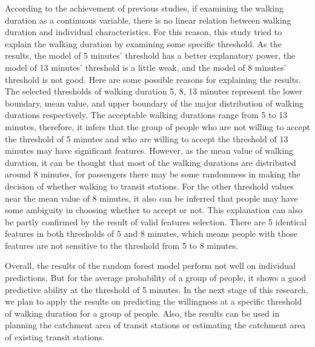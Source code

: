 \documentclass[Journal,letterpaper]{ascelike-new}
\begin{document}
%
According to the achievement of previous studies, if examining the walking duration as a continuous variable, there is no linear relation between walking duration and individual characteristics. For this reason, this study tried to explain the walking duration by examining some specific threshold. As the results, the model of 5 minutes’ threshold has a better explanatory power, the model of 13 minutes' threshold is a little weak, and the model of 8 minutes' threshold is not good. Here are some possible reasons for explaining the results. The selected thresholds of walking duration 5, 8, 13 minutes represent the lower boundary, mean value, and upper boundary of the major distribution of walking durations respectively. The acceptable walking durations range from 5 to 13 minutes, therefore, it infers that the group of people who are not willing to accept the threshold of 5 minutes and who are willing to accept the threshold of 13 minutes may have significant features. However, as the mean value of walking duration, it can be thought that most of the walking durations are distributed around 8 minutes, for passengers there may be some randomness in making the decision of whether walking to transit stations. For the other threshold values near the mean value of 8 minutes, it also can be inferred that people may have some ambiguity in choosing whether to accept or not. This explanation can also be partly confirmed by the result of valid features selection. There are 5 identical features in both thresholds of 5 and 8 minutes, which means people with those features are not sensitive to the threshold from 5 to 8 minutes.

%
Overall, the results of the random forest model perform not well on individual predictions. But for the average probability of a group of people, it shows a good predictive ability at the threshold of 5 minutes. In the next stage of this research, we plan to apply the results on predicting the willingness at a specific threshold of walking duration for a group of people. Also, the results can be used in planning the catchment area of transit stations or estimating the catchment area of existing transit stations.


\end{document}
